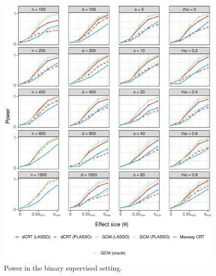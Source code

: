 \documentclass[12pt]{article}
\theoremstyle{definition}
\theoremstyle{remark}
\begin{document}
\begin{figure}[!ht]
	\centering
	\includegraphics[scale = 1]{figures/binomial_supervised_setting_alternative.pdf}
	\caption{Power in the binary supervised setting.}
	\label{fig:binomial_supervised_alternative}
\end{figure}
\end{document}
